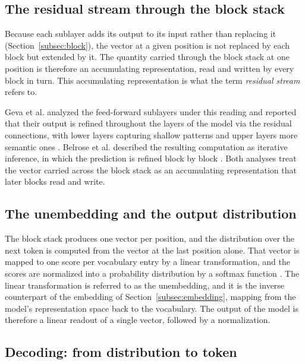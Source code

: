\subsection{The residual stream through the block stack}
\label{subsec:residual-stream}

Because each sublayer adds its output to its input rather than replacing it (Section~\ref{subsec:block}), the vector at a given position is not replaced by each block but extended by it. The quantity carried through the block stack at one position is therefore an accumulating representation, read and written by every block in turn. This accumulating representation is what the term \emph{residual stream} refers to.

Geva et al. analyzed the feed-forward sublayers under this reading and reported that their output is refined throughout the layers of the model via the residual connections, with lower layers capturing shallow patterns and upper layers more semantic ones \cite{gevaTransformerFeedForwardLayers2021}. Belrose et al. described the resulting computation as iterative inference, in which the prediction is refined block by block \cite{belroseElicitingLatentPredictions2025}. Both analyses treat the vector carried across the block stack as an accumulating representation that later blocks read and write.

\subsection{The unembedding and the output distribution}
\label{subsec:unembedding}

The block stack produces one vector per position, and the distribution over the next token is computed from the vector at the last position alone. That vector is mapped to one score per vocabulary entry by a linear transformation, and the scores are normalized into a probability distribution by a softmax function \cite{vaswaniAttentionAllYou2023}. The linear transformation is referred to as the unembedding, and it is the inverse counterpart of the embedding of Section~\ref{subsec:embedding}, mapping from the model's representation space back to the vocabulary. The output of the model is therefore a linear readout of a single vector, followed by a normalization.

\subsection{Decoding: from distribution to token}
\label{subsec:decoding}

